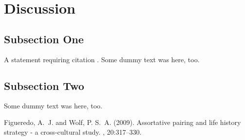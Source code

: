 \documentclass[twoside,twocolumn]{article}
\begin{document}
\section{Discussion}

\subsection{Subsection One}

A statement requiring citation \cite{Figueredo:2009dg}.
Some dummy text was here, too.

\subsection{Subsection Two}

Some dummy text was here, too.


\begin{thebibliography}{99} %

Figueredo, A.~J. and Wolf, P. S.~A. (2009).
\newblock Assortative pairing and life history strategy - a cross-cultural
  study.
, 20:317--330.
 
\end{thebibliography}

\end{document}
